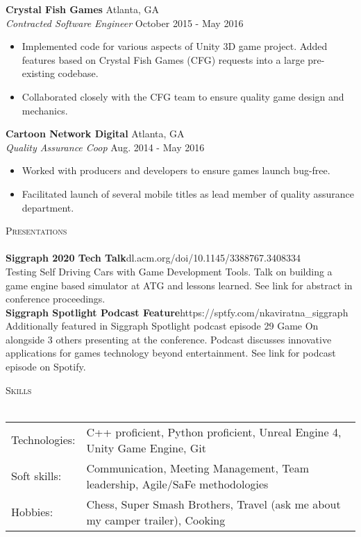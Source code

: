 \documentclass[a4paper]{article}
\newcommand{\lineunder} {
    \vspace*{-8pt} \\
    \hspace*{-18pt} \hrulefill \\
}
\newcommand{\header} [1] {
    {\hspace*{-18pt}\vspace*{6pt} \textsc{#1}}
    \vspace*{-6pt} \lineunder
}
\begin{document}
\textbf{Crystal Fish Games} \hfill Atlanta, GA\\
\textit{Contracted Software Engineer} \hfill October 2015 - May 2016\\
\vspace{-1mm}
\begin{itemize} \itemsep 1pt
	\item Implemented code for various aspects of Unity 3D game project. Added features based on Crystal Fish Games (CFG) requests into a large pre-existing codebase.
	\item Collaborated closely with the CFG team to ensure quality game design and mechanics.
\end{itemize}
\textbf{Cartoon Network Digital} \hfill Atlanta, GA\\
\textit{Quality Assurance Coop} \hfill Aug. 2014 - May 2016\\
\vspace{-1mm}
\begin{itemize} \itemsep 1pt
	\item Worked with producers and developers to ensure games launch bug-free.
	\item Facilitated launch of several mobile titles as lead member of quality assurance department.
\end{itemize}

\header{Presentations}
{\textbf{Siggraph 2020 Tech Talk}}\hfill dl.acm.org/doi/10.1145/3388767.3408334\\
\textquotedbl{}Testing Self Driving Cars with Game Development Tools\textquotedbl{}. Talk on building a game engine based simulator at ATG and lessons learned. See link for abstract in conference proceedings.\\
\vspace*{2mm}
{\textbf{Siggraph Spotlight Podcast Feature}}\hfill https://sptfy.com/nkaviratna\_siggraph\\
Additionally featured in Siggraph Spotlight podcast episode 29 \textquotedbl{}Game On\textquotedbl{} alongside 3 others presenting at the conference. Podcast discusses innovative applications for games technology beyond entertainment. See link for podcast episode on Spotify.\\
\vspace*{2mm}

\header{Skills}
\begin{tabular}{ l l }
	Technologies: & C++ proficient, Python proficient, Unreal Engine 4, Unity Game Engine, Git    \\
	Soft skills:  & Communication, Meeting Management, Team leadership, Agile/SaFe methodologies  \\
	Hobbies:      & Chess, Super Smash Brothers, Travel (ask me about my camper trailer), Cooking \\
\end{tabular}
\vspace{2mm}
\end{document}

